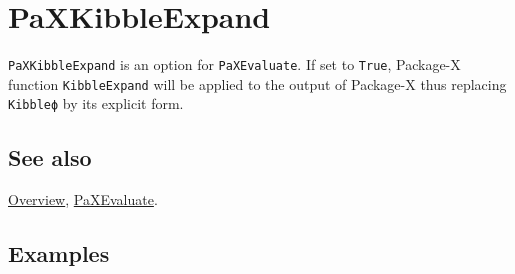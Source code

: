 \documentclass[../FeynHelpersManual.tex]{subfiles}
\begin{document}
\hypertarget{paxkibbleexpand}{
\section{PaXKibbleExpand}\label{paxkibbleexpand}}

\texttt{PaXKibbleExpand} is an option for \texttt{PaXEvaluate}. If set
to \texttt{True}, Package-X function \texttt{KibbleExpand} will be
applied to the output of Package-X thus replacing \texttt{Kibbleϕ} by
its explicit form.

\subsection{See also}

\hyperlink{toc}{Overview}, \hyperlink{paxevaluate}{PaXEvaluate}.

\subsection{Examples}
\end{document}
